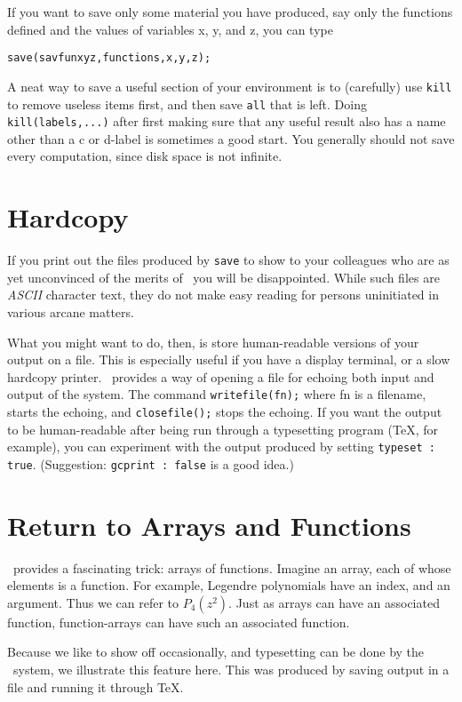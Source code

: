 If you want to save only some material you have produced, say only the
functions defined and the values of variables x, y, and z, you can type 
\begin{center}
{\tt save(savfunxyz,functions,x,y,z);}
\end{center}

A neat way to save a useful section of your environment is
to (carefully) use {\tt kill}
to remove useless
items first, and
then save {\tt all}
that is left.  Doing {\tt kill(labels,...)}
after first making sure that any useful result also has a name
other than a c or d-label is sometimes a good start.  You generally
should not save every computation, since disk space is not
infinite.

\section{Hardcopy}

If you print out the files produced by {\tt save}
to show to your
colleagues who are as yet unconvinced of the merits of
\Max\,
you will be disappointed.  While such files are {\it ASCII} character
text, they do not make easy reading for persons uninitiated in various
arcane matters.

What you might want to do, then, is store human-readable versions of
your output on a file.  This is especially useful if you have a
display terminal, or a slow hardcopy printer.
\Max\
provides a way of opening a file for echoing both input and output of
the system.
The command
{\tt writefile(fn);}
where fn is a filename, starts the echoing, and
{\tt closefile();}
stops the echoing.
If you want the output to be human-readable after being run through
a typesetting program (\TeX, for example), you can experiment with
the output produced by setting {\tt typeset : true}.
(Suggestion: {\tt gcprint : false} is a good idea.)


\section{Return to Arrays and Functions}

\Max\
provides a fascinating trick: arrays of functions. Imagine an array, each
of whose elements is a function.  For example, Legendre polynomials have
an index, and an argument.  Thus we can refer to $ P_4 ( z^2 )$.
Just as arrays can
have an associated function, function-arrays can have such an associated
function.

Because we like to show off occasionally, and typesetting can be done by the 
\Max\ system, we illustrate this feature here.
This was produced by saving output in a file
and running it through \TeX{}.


